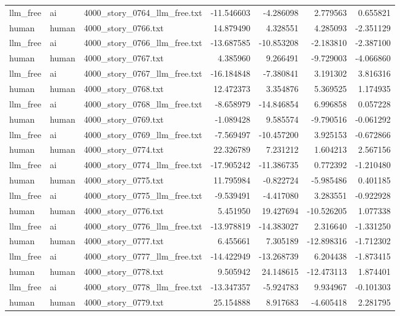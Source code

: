 \begin{longtable}{lllrrrr}
llm\_free & ai & 4000\_story\_0764\_llm\_free.txt & -11.546603 & -4.286098 & 2.779563 & 0.655821 \\
human & human & 4000\_story\_0766.txt & 14.879490 & 4.328551 & 4.285093 & -2.351129 \\
llm\_free & ai & 4000\_story\_0766\_llm\_free.txt & -13.687585 & -10.853208 & -2.183810 & -2.387100 \\
human & human & 4000\_story\_0767.txt & 4.385960 & 9.266491 & -9.729003 & -4.066860 \\
llm\_free & ai & 4000\_story\_0767\_llm\_free.txt & -16.184848 & -7.380841 & 3.191302 & 3.816316 \\
human & human & 4000\_story\_0768.txt & 12.472373 & 3.354876 & 5.369525 & 1.174935 \\
llm\_free & ai & 4000\_story\_0768\_llm\_free.txt & -8.658979 & -14.846854 & 6.996858 & 0.057228 \\
human & human & 4000\_story\_0769.txt & -1.089428 & 9.585574 & -9.790516 & -0.061292 \\
llm\_free & ai & 4000\_story\_0769\_llm\_free.txt & -7.569497 & -10.457200 & 3.925153 & -0.672866 \\
human & human & 4000\_story\_0774.txt & 22.326789 & 7.231212 & 1.604213 & 2.567156 \\
llm\_free & ai & 4000\_story\_0774\_llm\_free.txt & -17.905242 & -11.386735 & 0.772392 & -1.210480 \\
human & human & 4000\_story\_0775.txt & 11.795984 & -0.822724 & -5.985486 & 0.401185 \\
llm\_free & ai & 4000\_story\_0775\_llm\_free.txt & -9.539491 & -4.417080 & 3.283551 & -0.922928 \\
human & human & 4000\_story\_0776.txt & 5.451950 & 19.427694 & -10.526205 & 1.077338 \\
llm\_free & ai & 4000\_story\_0776\_llm\_free.txt & -13.978819 & -14.383027 & 2.316640 & -1.331250 \\
human & human & 4000\_story\_0777.txt & 6.455661 & 7.305189 & -12.898316 & -1.712302 \\
llm\_free & ai & 4000\_story\_0777\_llm\_free.txt & -14.422949 & -13.268739 & 6.204438 & -1.873415 \\
human & human & 4000\_story\_0778.txt & 9.505942 & 24.148615 & -12.473113 & 1.874401 \\
llm\_free & ai & 4000\_story\_0778\_llm\_free.txt & -13.347357 & -5.924783 & 9.934967 & -0.101303 \\
human & human & 4000\_story\_0779.txt & 25.154888 & 8.917683 & -4.605418 & 2.281795 \\

\end{longtable}
